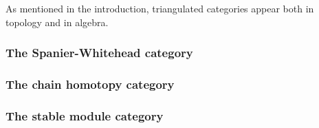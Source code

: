 As mentioned in the introduction, triangulated categories appear both in topology and in algebra.

\subsubsection{The Spanier-Whitehead category}


\subsubsection{The chain homotopy category}


\subsubsection{The stable module category}
